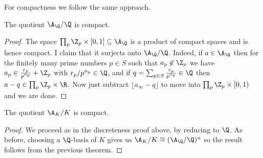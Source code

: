 For compactness we follow the same approach.

\begin{theorem}
  \label{Rat.AdeleRing.cocompact}
  \leanok
  The quotient $\A_{\Q}/\Q$ is compact.
\end{theorem}
\begin{proof}
  The space $\prod_p\Z_p\times[0,1]\subseteq\A_{\Q}$ is a product of compact spaces
  and is hence compact. I claim that it surjects onto $\A_{\Q}/\Q$. Indeed,
  if $a\in\A_{\Q}$ then for the finitely many prime numbers $p\in S$ such that $a_p\not\in\Z_p$
  we have $a_p\in\frac{r_p}{p^{n_p}}+\Z_p$ with $r_p/p^{n_p}\in\Q$, and
  if $q=\sum_{p\in S}\frac{r_p}{p^{n_p}}\in\Q$ then $a-q\in \prod_p\Z_p\times\R$.
  Now just subtract $\lfloor a_{\infty}-q\rfloor$ to move into $\prod_p\Z_p\times[0,1)$
  and we are done.
\end{proof}

\begin{theorem}
  \label{NumberField.AdeleRing.cocompact}
  \leanok
  The quotient $\A_K/K$ is compact.
\end{theorem}
\begin{proof}
  We proceed as in the discreteness proof above, by reducing to $\Q$. As before, choosing
  a $\Q$-basis of $K$ gives us $\A_K/K\cong(\A_{\Q}/\Q)^n$ so the result follows from
  the previous theorem.
\end{proof}
